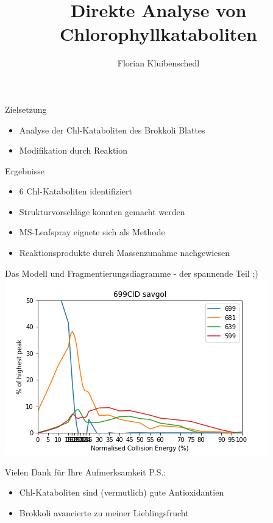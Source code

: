 \documentclass[12pt]{beamer}
\author{Florian Kluibenschedl}
\title{Direkte Analyse von Chlorophyllkataboliten}
\begin{document}
\begin{frame}
\titlepage
\end{frame}


\begin{frame}{Zielsetzung}
 \begin{itemize}
 \item Analyse der Chl-Kataboliten des Brokkoli Blattes
 \item Modifikation durch Reaktion
 \end{itemize}
\end{frame}

\begin{frame}{Ergebnisse}
 \begin{itemize}
 \item 6 Chl-Kataboliten identifiziert
 \item Strukturvorschläge konnten gemacht werden
 \item MS-Leafspray eignete sich als Methode
 \item Reaktionsprodukte durch Massenzunahme nachgewiesen
 \end{itemize}
\end{frame}

\begin{frame}{Das Modell und Fragmentierungsdiagramme - der spannende Teil ;)}
 \includegraphics[scale=0.65]{699CID-savgol1.png}
\end{frame}

\begin{frame}{Vielen Dank für Ihre Aufmerksamkeit}
P.S.:
 \begin{itemize}
 \item Chl-Kataboliten sind (vermutlich) gute Antioxidantien
 \item Brokkoli avancierte zu meiner Lieblingsfrucht
 \end{itemize}
\end{frame}
\end{document}
